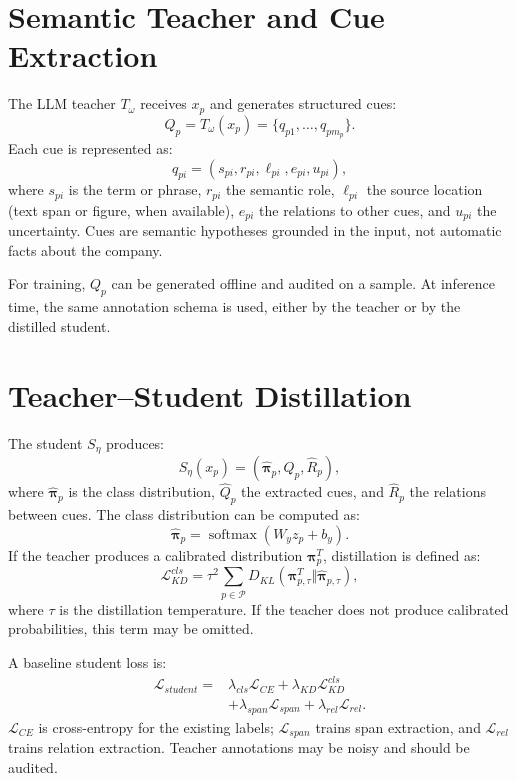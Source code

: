 \documentclass[11pt,a4paper]{article}
\begin{document}
\section{Semantic Teacher and Cue Extraction}
The LLM teacher $T_{\omega}$ receives $x_p$ and generates structured cues:
\begin{equation}
Q_p=T_{\omega}(x_p)=\{q_{p1},\ldots,q_{pm_p}\}.
\end{equation}
Each cue is represented as:
\begin{equation}
q_{pi}=(s_{pi},r_{pi},\ell_{pi},e_{pi},u_{pi}),
\end{equation}
where $s_{pi}$ is the term or phrase, $r_{pi}$ the semantic role, $\ell_{pi}$ the source location (text span or figure, when available), $e_{pi}$ the relations to other cues, and $u_{pi}$ the uncertainty. Cues are semantic hypotheses grounded in the input, not automatic facts about the company.

For training, $Q_p$ can be generated offline and audited on a sample. At inference time, the same annotation schema is used, either by the teacher or by the distilled student.

\section{Teacher--Student Distillation}
The student $S_{\eta}$ produces:
\begin{equation}
S_{\eta}(x_p)=(\hat{\boldsymbol{\pi}}_p,\hat{Q}_p,\hat{R}_p),
\end{equation}
where $\hat{\boldsymbol{\pi}}_p$ is the class distribution, $\hat{Q}_p$ the extracted cues, and $\hat{R}_p$ the relations between cues. The class distribution can be computed as:
\begin{equation}
\hat{\boldsymbol{\pi}}_p=\operatorname{softmax}(W_yz_p+b_y).
\end{equation}
If the teacher produces a calibrated distribution $\boldsymbol{\pi}^{T}_p$, distillation is defined as:
\begin{equation}
\mathcal{L}_{KD}^{cls}=\tau^2\sum_{p\in\mathcal{P}}
D_{KL}(\boldsymbol{\pi}^{T}_{p,\tau}\Vert
\hat{\boldsymbol{\pi}}_{p,\tau}),
\end{equation}
where $\tau$ is the distillation temperature. If the teacher does not produce calibrated probabilities, this term may be omitted.

A baseline student loss is:
\begin{align}
\mathcal{L}_{student}={}&
\lambda_{cls}\mathcal{L}_{CE}
+\lambda_{KD}\mathcal{L}_{KD}^{cls}\\
&+\lambda_{span}\mathcal{L}_{span}
+\lambda_{rel}\mathcal{L}_{rel}.
\end{align}
$\mathcal{L}_{CE}$ is cross-entropy for the existing labels; $\mathcal{L}_{span}$ trains span extraction, and $\mathcal{L}_{rel}$ trains relation extraction. Teacher annotations may be noisy and should be audited.
\end{document}
